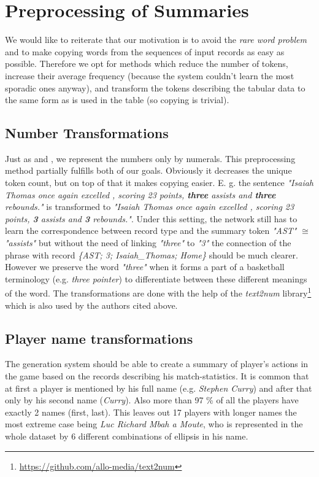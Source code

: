 \section{Preprocessing of Summaries}

We would like to reiterate that our motivation is to avoid the \emph{rare word problem} and to make copying words from the sequences of input records as easy as possible. Therefore we opt for methods which reduce the number of tokens, increase their average frequency (because the system couldn't learn the most sporadic ones anyway), and transform the tokens describing the tabular data to the same form as is used in the table (so copying is trivial).

\subsection{Number Transformations} \label{subsection:number_transformations_summaries}

Just as \citet{wiseman2017} and \citet{puduppully2019datatotext}, we represent the numbers only by numerals. This preprocessing method partially fulfills both of our goals. Obviously it decreases the unique token count, but on top of that it makes copying easier. E. g. the sentence \emph{"Isaiah Thomas once again excelled , scoring 23 points, \textbf{three} assists and \textbf{three} rebounds."} is transformed to \emph{"Isaiah Thomas once again excelled , scoring 23 points, \textbf{3} assists and \textbf{3} rebounds."}. Under this setting, the network still has to learn the correspondence between record type and the summary token \emph{"AST"} $\cong$ \emph{"assists"} but without the need of linking \emph{"three"} to \emph{"3"} the connection of the phrase with record \emph{\{AST; 3; Isaiah\_Thomas; Home\}} should be much clearer. However we preserve the word \emph{"three"} when it forms a part of a basketball terminology (e.g. \emph{three pointer}) to differentiate between these different meanings of the word. The transformations are done with the help of the \emph{text2num} library\footnote{\url{https://github.com/allo-media/text2num}} which is also used by the authors cited above.

\subsection{Player name transformations} \label{subsection:player_name_transformations_summary}

The generation system should be able to create a summary of player's actions in the game based on the records describing his match-statistics. It is common that at first a player is mentioned by his full name (e.g. \emph{Stephen Curry}) and after that only by his second name (\emph{Curry}). Also more than 97 \% of all the players have exactly 2 names (first, last). This leaves out 17 players with longer names the most extreme case being \emph{Luc Richard Mbah a Moute}, who is represented in the whole dataset by 6 different combinations of ellipsis in his name.

